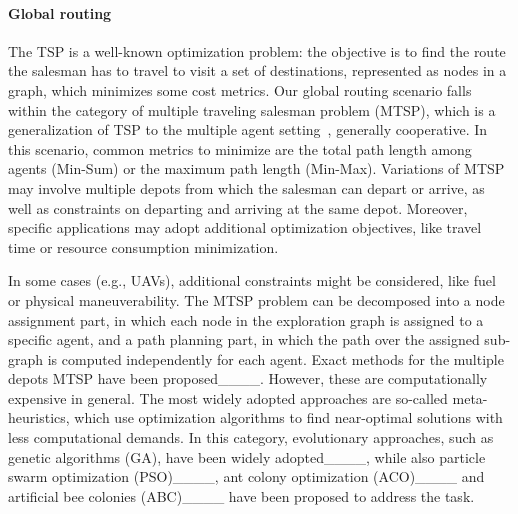 \paragraph{Global routing}
The TSP is a well-known optimization problem: the objective is to find the route the salesman has to travel to visit a set of destinations, represented as nodes in a graph, which minimizes some cost metrics. 
Our global routing scenario falls within the category of multiple traveling salesman problem (MTSP), which is a generalization of TSP to the multiple agent setting~\cite {cheikhrouhou2021comprehensive}, generally cooperative.
In this scenario, common metrics to minimize are the total path length among agents (Min-Sum) or the maximum path length (Min-Max). 
Variations of MTSP may involve multiple depots from which the salesman can depart or arrive, as well as constraints on departing and arriving at the same depot. 
Moreover, specific applications may adopt additional optimization objectives, like travel time or resource consumption minimization. 

In some cases (e.g., UAVs), additional constraints might be considered, like fuel or physical maneuverability. 
The MTSP problem can be decomposed into a node assignment part, in which each node in the exploration graph is assigned to a specific agent, and a path planning part, in which the path over the assigned sub-graph is computed independently for each agent. 
Exact methods for the multiple depots MTSP have been proposed____. 
However, these are computationally expensive in general. 
The most widely adopted approaches are so-called meta-heuristics, which use optimization algorithms to find near-optimal solutions with less computational demands. 
In this category, evolutionary approaches, such as genetic algorithms (GA), have been widely adopted____, while also particle swarm optimization (PSO)____, ant colony optimization (ACO)____ and artificial bee colonies (ABC)____ have been proposed to address the task. 

